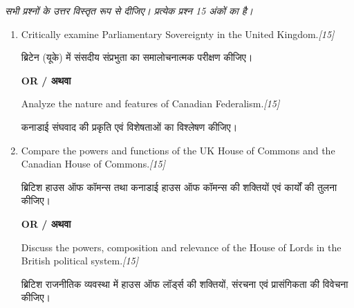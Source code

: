 \documentclass[11pt,a4paper]{article}
\newcommand{\pts}[1]{\hfill \textit{[#1]}}
\begin{document}
\noindent \textit{सभी प्रश्नों के उत्तर विस्तृत रूप से दीजिए। प्रत्येक प्रश्न 15 अंकों का है।}

\begin{enumerate}[label=\textbf{\arabic*.},leftmargin=*,start=5,itemsep=14pt]

  \item Critically examine Parliamentary Sovereignty in the United Kingdom.\pts{15}
  
  ब्रिटेन (यूके) में संसदीय संप्रभुता का समालोचनात्मक परीक्षण कीजिए।

  \begin{center}\textbf{OR / अथवा}\end{center}

  Analyze the nature and features of Canadian Federalism.\pts{15}
  
  कनाडाई संघवाद की प्रकृति एवं विशेषताओं का विश्लेषण कीजिए।

  \item Compare the powers and functions of the UK House of Commons and the Canadian House of Commons.\pts{15}
  
  ब्रिटिश हाउस ऑफ कॉमन्स तथा कनाडाई हाउस ऑफ कॉमन्स की शक्तियों एवं कार्यों की तुलना कीजिए।

  \begin{center}\textbf{OR / अथवा}\end{center}

  Discuss the powers, composition and relevance of the House of Lords in the British political system.\pts{15}
  
  ब्रिटिश राजनीतिक व्यवस्था में हाउस ऑफ लॉर्ड्स की शक्तियों, संरचना एवं प्रासंगिकता की विवेचना कीजिए।

\end{enumerate}
\end{document}
